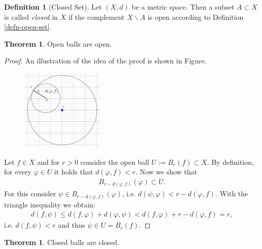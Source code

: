 \documentclass[12pt, a4paper]{article}
\numberwithin{equation}{section}
\theoremstyle{definition}
\theoremstyle{definition}
\newtheorem{defn}[thm]{Definition} %
\newtheorem{theorem}[thm]{Theorem}
\begin{document}
	\begin{defn}[Closed Set]
		Let $(X, d)$ be a metric space. Then a subset $A\subset X$ is called \textit{closed} in $X$ if the complement $X\backslash A$ is open according to Definition \ref{defn-open-set}. 
	\end{defn}

	\begin{theorem}\label{open-balls-open}
		Open balls are open. 
	\end{theorem}
	
	\begin{proof}
		An illustration of the idea of the proof is shown in Figure. 
		\begin{figure}[h!]
			\centering
			\includegraphics[width=0.35\textwidth]{Figures/open-balls-open.png}
		\end{figure}
		
		Let $f\in X$ and for $r > 0$ consider the open ball $U:= B_{r}(f) \subset X$. By definition, for every $\varphi \in U$ it holds that $d\left(\varphi, f\right) < r$. Now we show that 
		\begin{align}
			B_{r-d\left(\varphi, f\right)}(\varphi) \subset U.
		\end{align}
		For this consider $\psi\in B_{r-d\left(\varphi, f\right)}(\varphi)$, i.e. $d(\psi, \varphi) < r - d(\varphi, f)$. With the triangle inequality we obtain: 
		\begin{align}
			d(f, \psi) \leq d(f, \varphi) + d(\varphi, \psi) < d(f, \varphi) + r - d(\varphi, f) = r,  		
		\end{align}
		i.e. $d(f, \psi) < r$ and thus $\psi\in U = B_{r}(f)$.
	\end{proof}
	
	
	\begin{theorem}\label{thrm:closed_balls_open}
		Closed balls are closed.
	\end{theorem}
	
\end{document}
